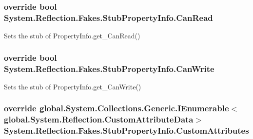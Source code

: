 \hypertarget{class_system_1_1_reflection_1_1_fakes_1_1_stub_property_info_afa038b11f19e3376b66e1beaf33c728c}{
\subsubsection[{Can\-Read}]{\setlength{\rightskip}{0pt plus 5cm}override bool System.\-Reflection.\-Fakes.\-Stub\-Property\-Info.\-Can\-Read\hspace{0.3cm}{\ttfamily [get]}}}\label{class_system_1_1_reflection_1_1_fakes_1_1_stub_property_info_afa038b11f19e3376b66e1beaf33c728c}


Sets the stub of Property\-Info.\-get\-\_\-\-Can\-Read()

\hypertarget{class_system_1_1_reflection_1_1_fakes_1_1_stub_property_info_a7e3c30642e3e85566324e2af93eb1577}{
\subsubsection[{Can\-Write}]{\setlength{\rightskip}{0pt plus 5cm}override bool System.\-Reflection.\-Fakes.\-Stub\-Property\-Info.\-Can\-Write\hspace{0.3cm}{\ttfamily [get]}}}\label{class_system_1_1_reflection_1_1_fakes_1_1_stub_property_info_a7e3c30642e3e85566324e2af93eb1577}


Sets the stub of Property\-Info.\-get\-\_\-\-Can\-Write()

\hypertarget{class_system_1_1_reflection_1_1_fakes_1_1_stub_property_info_a1946fed4f236baa1d8daa4c98472713f}{
\subsubsection[{Custom\-Attributes}]{\setlength{\rightskip}{0pt plus 5cm}override global.\-System.\-Collections.\-Generic.\-I\-Enumerable$<$global.\-System.\-Reflection.\-Custom\-Attribute\-Data$>$ System.\-Reflection.\-Fakes.\-Stub\-Property\-Info.\-Custom\-Attributes\hspace{0.3cm}{\ttfamily [get]}}}\label{class_system_1_1_reflection_1_1_fakes_1_1_stub_property_info_a1946fed4f236baa1d8daa4c98472713f}


